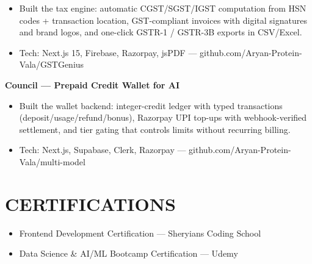 \documentclass[9pt]{article}
\begin{document}
\begin{itemize}[leftmargin=11pt,itemsep=0pt,topsep=1pt,parsep=0pt]
\item Built the tax engine: automatic CGST/SGST/IGST computation from HSN codes + transaction location, GST-compliant invoices with digital signatures and brand logos, and one-click GSTR-1 / GSTR-3B exports in CSV/Excel.
\item Tech: Next.js 15, Firebase, Razorpay, jsPDF  ---  github.com/Aryan-Protein-Vala/GSTGenius
\end{itemize}
\textbf{Council  ---  Prepaid Credit Wallet for AI}
\vspace{1pt}
\begin{itemize}[leftmargin=11pt,itemsep=0pt,topsep=1pt,parsep=0pt]
\item Built the wallet backend: integer-credit ledger with typed transactions (deposit/usage/refund/bonus), Razorpay UPI top-ups with webhook-verified settlement, and tier gating that controls limits without recurring billing.
\item Tech: Next.js, Supabase, Clerk, Razorpay  ---  github.com/Aryan-Protein-Vala/multi-model
\end{itemize}
\section*{CERTIFICATIONS}
\begin{itemize}[leftmargin=11pt,itemsep=0pt,topsep=1pt,parsep=0pt]
\item Frontend Development Certification  ---  Sheryians Coding School
\item Data Science \& AI/ML Bootcamp Certification  ---  Udemy
\end{itemize}
\end{document}
